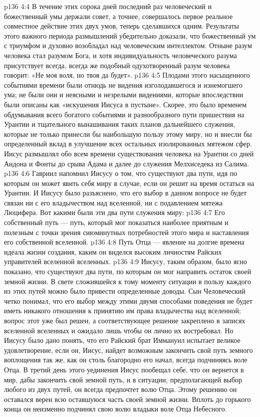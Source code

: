 \vs p136 4:4 \pc В течение этих сорока дней последний раз человеческий и божественный умы держали совет, а точнее, совершалось первое реальное совместное действие этих двух умов, теперь сделавшихся одним. Результаты этого важного периода размышлений убедительно доказали, что божественный ум с триумфом и духовно возобладал над человеческим интеллектом. Отныне разум человека стал разумом Бога, и хотя индивидуальность человеческого разума присутствует всегда, всегда же подобный одухотворенный разум человека говорит: «Не моя воля, но твоя да будет».
\vs p136 4:5 Плодами этого насыщенного событиями времени были отнюдь не видения изголодавшегося и изнемогшего ума; не были они и неясными и незрелыми видениями, которые впоследствии были описаны как «искушения Иисуса в пустыне». Скорее, это было временем обдумывания всего богатого событиями и разнообразного пути пришествия на Урантии и тщательного вынашивания таких планов дальнейшего служения, которые не только принесли бы наибольшую пользу этому миру, но и внесли бы определенный вклад в улучшение всех остальных изолированных мятежом сфер. Иисус размышлял обо всем времени существования человека на Урантии со дней Андона и Фонты до срыва Адама и далее до служения Мелхиседека из Салима.
\vs p136 4:6 Гавриил напомнил Иисусу о том, что существуют два пути, идя по которым он может явить себя миру в случае, если он решит на время остаться на Урантии. И Иисусу было разъяснено, что его выбор в данном вопросе не будет связан ни с его владычеством над вселенной, ни с подавлением мятежа Люцифера. Вот какими были эти два пути служения миру:
\vs p136 4:7 \pc {}\bibnobreakspace Его собственный путь --- путь, который мог показаться наиболее приятным и полезным с точки зрения сиюминутных потребностей этого мира и наставления его собственной вселенной.
\vs p136 4:8 \bibnobreakspace Путь Отца --- явление на долгие времена идеала жизни создания, каким он виделся высоким личностям Райских управителей вселенной вселенных.
\vs p136 4:9 Иисусу, таким образом, было ясно показано, что существуют два пути, по которым он мог направить остаток своей земной жизни. В свете сложившейся к тому моменту ситуации в пользу каждого из этих путей можно было привести определенные доводы. Сын Человеческий четко понимал, что его выбор между этими двумя способами поведения не будет иметь никакого отношения к принятию им права владычества над вселенной; вопрос этот уже был решен, а соответствующее решение закреплено в записях вселенной вселенных и ожидало лишь чтобы он лично их востребовал. Но Иисусу было дано понять, что его Райский брат Иммануил испытает великое удовлетворение, если он, Иисус, найдет возможным закончить свой путь земного воплощения так же, как он столь благородно его начал, всегда подчиняясь воле Отца. В третий день этого уединения Иисус пообещал себе, что он вернется в мир, дабы закончить свой земной путь, и в ситуации, предполагающей выбор любого из двух путей, он всегда предпочтет волю Отца. Этому решению он оставался верен всю оставшуюся часть своей земной жизни. Вплоть до горького конца он неизменно подчинял свою волю владыки воле Отца Небесного.

